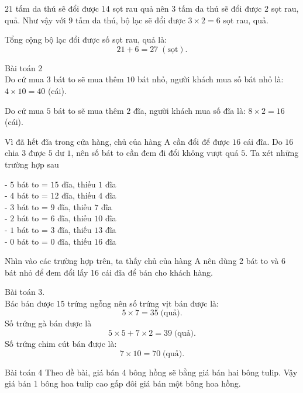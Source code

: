 $21$ tấm da thú sẽ đổi được $14$ sọt rau quả nên $3$ tấm da thú sẽ đổi được $2$ sọt rau, quả. Như vậy với $9$ tấm da thú, bộ lạc sẽ đổi được $3\times 2= 6$ sọt rau, quả. %

Tổng cộng bộ lạc đổi được số sọt rau, quả là: $$21+6=27 \;(\text{sọt}).$$

Bài toán 2\\
Do cứ mua $3$ bát to sẽ mua thêm $10$ bát nhỏ, người khách mua số bát nhỏ là:  $4\times 10= 40$ (cái).

Do cứ mua $5$ bát to sẽ mua thêm $2$ đĩa, người khách mua số đĩa là: $ 8\times 2= 16$ (cái).

Vì đã hết đĩa trong cửa hàng, chủ của hàng A cần đổi để được $16$ cái đĩa. Do $16$ chia $3$ được $5$ dư $1$, nên số bát to cần đem đi đổi không vượt quá $5$. Ta xét những trường hợp sau

-	$5$ bát to  =  $15$ đĩa, thiếu $1$ đĩa\\
-	$4$ bát to  =   $12$ đĩa, thiếu $4$ đĩa\\
-	$3$ bát to = $9$ đĩa, thiếu $7$ đĩa\\
-	$2$ bát to = $6$ đĩa, thiếu $10$ đĩa\\
-	$1$ bát to = $3$ đĩa, thiếu $13$ đĩa\\
-	$0$ bát to = $0$ đĩa, thiếu $16$ đĩa

Nhìn vào các trường hợp trên, ta thấy chủ của hàng A nên dùng 2 bát to và 6 bát nhỏ để đem đổi lấy 16 cái đĩa để bán cho khách hàng.

Bài toán 3.\\
Bác bán được $15$ trứng ngỗng nên số trứng vịt bán được là: 
$$5\times 7=35 \;\text{(quả)}.$$
Số trứng gà bán được là
$$5\times 5+ 7\times 2= 39 \;\text{(quả)}.$$
Số trứng chim cút bán được là:
$$7\times 10=70 \;\text{(quả)}.$$

Bài toán 4
Theo đề bài, giá bán 4 bông hồng sẽ bằng giá bán hai bông tulip. Vậy giá bán 1 bông hoa tulip cao gấp đôi giá bán một bông hoa hồng.

